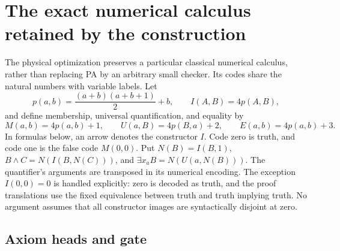 \section{The exact numerical calculus retained by the construction}
\label{sec:logical-basis}

The physical optimization preserves a particular classical numerical
calculus, rather than replacing PA by an arbitrary small checker.
Its codes share the natural numbers with variable labels. Let
\[
 p(a,b)=\frac{(a+b)(a+b+1)}2+b,
 \qquad I(A,B)=4p(A,B),
\]
and define membership, universal quantification, and equality by
\[
 M(a,b)=4p(a,b)+1,\qquad
 U(a,B)=4p(B,a)+2,\qquad E(a,b)=4p(a,b)+3.
\]
In formulas below, an arrow denotes the constructor $I$. Code zero is
truth, and code one is the false code $M(0,0)$. Put
$N(B)=I(B,1)$, $B\wedge C=N(I(B,N(C)))$, and
$\exists x_a B=N(U(a,N(B)))$.
The quantifier's arguments are transposed in its numerical encoding.
The exception $I(0,0)=0$ is handled explicitly: zero is decoded as truth,
and the proof translations use the fixed equivalence between truth and
truth implying truth. No argument assumes that all constructor images
are syntactically disjoint at zero.

\subsection{Axiom heads and gate}

